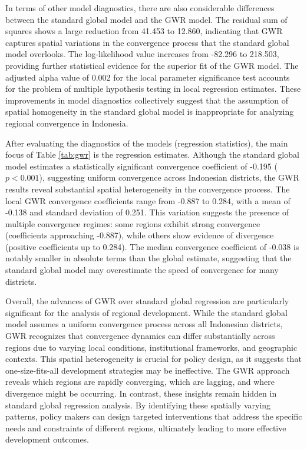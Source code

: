 \documentclass[smallextended, natbib]{svjour3}       %
\begin{document}
In terms of other model diagnostics, there are also considerable differences between the  standard global  model and the GWR model. 
The residual sum of squares shows a large reduction from 41.453 to 12.860, indicating that GWR captures spatial variations in the convergence process that the standard global  model overlooks. 
The log-likelihood value increases from -82.296 to 218.503, providing further statistical evidence for the superior fit of the GWR model. 
The adjusted alpha value of 0.002 for the local parameter significance test accounts for the problem of multiple hypothesis testing in local regression estimates.
These improvements in model diagnostics collectively suggest that the assumption of spatial homogeneity in the standard global  model is inappropriate for analyzing regional convergence in Indonesia.


After evaluating the diagnostics of the models (regression statistics), the main focus of Table \ref{tab:gwr} is the regression estimates.
Although the standard global  model estimates a statistically significant convergence coefficient of -0.195 ($p<0.001$), suggesting uniform convergence across Indonesian districts, the GWR results reveal substantial spatial heterogeneity in the convergence process. 
The local GWR convergence coefficients range from -0.887 to 0.284, with a mean of -0.138 and standard deviation of 0.251. 
This variation suggests the presence of multiple convergence regimes: some regions exhibit strong convergence (coefficients approaching -0.887), while others show evidence of divergence (positive coefficients up to 0.284). 
The median convergence coefficient of -0.038 is notably smaller in absolute terms than the global estimate, suggesting that the standard global  model may overestimate the speed of convergence for many districts.

Overall, the advances of GWR over standard global  regression are particularly significant for the analysis of regional development. 
While the standard global  model assumes a uniform convergence process across all Indonesian districts, GWR recognizes that convergence dynamics can differ substantially across regions due to varying local conditions, institutional frameworks, and geographic contexts. 
This spatial heterogeneity is crucial for policy design, as it suggests that one-size-fits-all development strategies may be ineffective. 
The GWR approach reveals which regions are rapidly converging, which are lagging, and where divergence might be occurring.
In contrast, these insights remain hidden in standard global  regression analysis. 
By identifying these spatially varying patterns, policy makers can design targeted interventions that address the specific needs and constraints of different regions, ultimately leading to more effective development outcomes.
\end{document}
